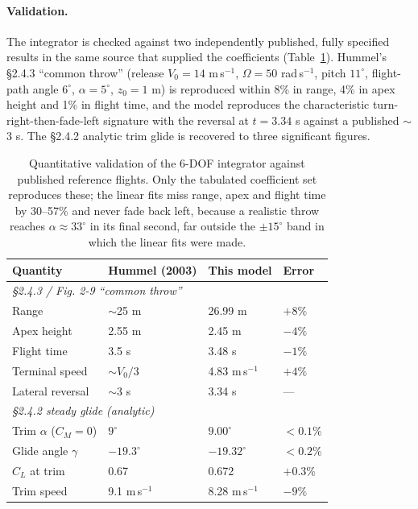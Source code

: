 \documentclass[11pt,letterpaper]{article}
\begin{document}
\paragraph{Validation.} The integrator is checked against two independently
published, fully specified results in the same source that supplied the
coefficients (Table~\ref{tab:p1valid}). Hummel's \S2.4.3 ``common throw''
(release $V_0=14$ m\,s$^{-1}$, $\Omega=50$ rad\,s$^{-1}$, pitch $11^\circ$,
flight-path angle $6^\circ$, $\alpha=5^\circ$, $z_0=1$ m) is reproduced within
8\% in range, 4\% in apex height and 1\% in flight time, and the model
reproduces the characteristic turn-right-then-fade-left signature with the
reversal at $t=3.34$ s against a published $\sim$3 s. The \S2.4.2 analytic trim
glide is recovered to three significant figures.

\begin{table}[H]
\centering
\small
\begin{tabular}{llll}
\toprule
Quantity & Hummel (2003) & This model & Error \\
\midrule
\multicolumn{4}{l}{\emph{\S2.4.3 / Fig. 2-9 ``common throw''}}\\
Range                       & $\sim$25 m   & 26.99 m  & $+8\%$ \\
Apex height                 & 2.55 m       & 2.45 m   & $-4\%$ \\
Flight time                 & 3.5 s        & 3.48 s   & $-1\%$ \\
Terminal speed              & $\sim V_0/3$ & 4.83 m\,s$^{-1}$ & $+4\%$ \\
Lateral reversal            & $\sim$3 s    & 3.34 s   & --- \\
\multicolumn{4}{l}{\emph{\S2.4.2 steady glide (analytic)}}\\
Trim $\alpha$ ($C_M=0$)     & $9^\circ$    & $9.00^\circ$   & $<0.1\%$ \\
Glide angle $\gamma$        & $-19.3^\circ$& $-19.32^\circ$ & $<0.2\%$ \\
$C_L$ at trim               & 0.67         & 0.672    & $+0.3\%$ \\
Trim speed                  & 9.1 m\,s$^{-1}$ & 8.28 m\,s$^{-1}$ & $-9\%$ \\
\bottomrule
\end{tabular}
\caption{Quantitative validation of the 6-DOF integrator against published
reference flights. Only the tabulated coefficient set reproduces these; the
linear fits miss range, apex and flight time by 30--57\% and never fade back
left, because a realistic throw reaches $\alpha \approx 33^\circ$ in its final
second, far outside the $\pm15^\circ$ band in which the linear fits were made.}
\label{tab:p1valid}
\end{table}
\end{document}
